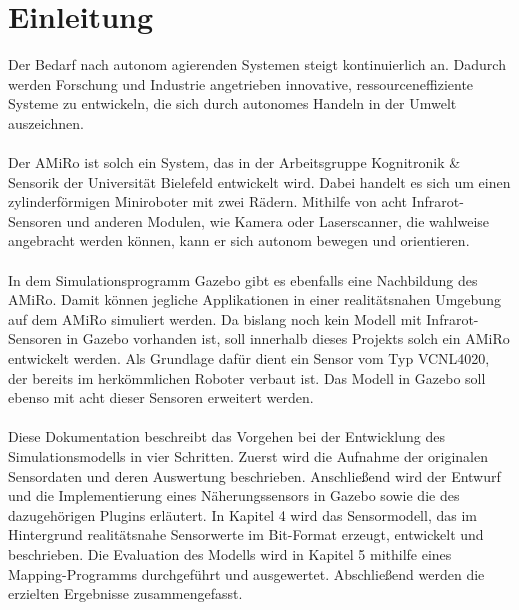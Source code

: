 \section{Einleitung}\label{einleitung}
Der Bedarf nach autonom agierenden Systemen steigt kontinuierlich an. Dadurch werden Forschung und Industrie angetrieben innovative, ressourceneffiziente Systeme zu entwickeln, die sich durch autonomes Handeln in der Umwelt auszeichnen.\\\\
Der AMiRo ist solch ein System, das in der Arbeitsgruppe Kognitronik \& Sensorik der Universität Bielefeld entwickelt wird. Dabei handelt es sich um einen zylinderförmigen Miniroboter mit zwei Rädern. Mithilfe von acht Infrarot-Sensoren und anderen Modulen, wie Kamera oder Laserscanner, die wahlweise angebracht werden können, kann er sich autonom bewegen und orientieren\cite{AMiRo}.\\\\
In dem Simulationsprogramm Gazebo gibt es ebenfalls eine Nachbildung des AMiRo. Damit können jegliche Applikationen in einer realitätsnahen Umgebung auf dem AMiRo simuliert werden. Da bislang noch kein Modell mit Infrarot-Sensoren in Gazebo vorhanden ist, soll innerhalb dieses Projekts solch ein AMiRo entwickelt werden. Als Grundlage dafür dient ein Sensor vom Typ VCNL4020, der bereits im herkömmlichen Roboter verbaut ist. Das Modell in Gazebo soll ebenso mit acht dieser Sensoren erweitert werden.\\\\
Diese Dokumentation beschreibt das Vorgehen bei der Entwicklung des Simulationsmodells in vier Schritten. Zuerst wird die Aufnahme der originalen Sensordaten und deren Auswertung beschrieben. Anschließend wird der Entwurf und die Implementierung eines Näherungssensors in Gazebo sowie die des dazugehörigen Plugins erläutert. In Kapitel 4 wird das Sensormodell, das im Hintergrund realitätsnahe Sensorwerte im \unit[16]{Bit}-Format erzeugt, entwickelt und beschrieben. Die Evaluation des Modells wird in Kapitel 5 mithilfe eines Mapping-Programms durchgeführt und ausgewertet. Abschließend werden die erzielten Ergebnisse zusammengefasst.